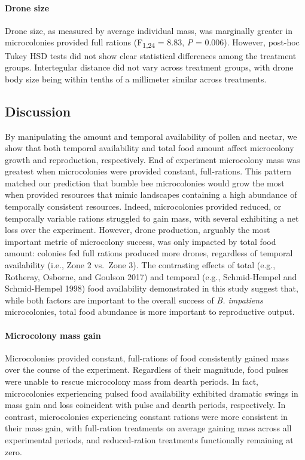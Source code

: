 \documentclass[11pt,]{article}
\let\oldparagraph\paragraph
\renewcommand{\paragraph}[1]{\oldparagraph{#1}\mbox{}}
\begin{document}
\hypertarget{drone-size}{%
\paragraph{Drone size}\label{drone-size}}

Drone size, as measured by average individual mass, was marginally
greater in microcolonies provided full rations (F\textsubscript{1,24} =
8.83, \emph{P} = 0.006). However, post-hoc Tukey HSD tests did not show
clear statistical differences among the treatment groups. Intertegular
distance did not vary across treatment groups, with drone body size
being within tenths of a millimeter similar across treatments.

\hypertarget{discussion}{%
\subsection{Discussion}\label{discussion}}

By manipulating the amount and temporal availability of pollen and
nectar, we show that both temporal availability and total food amount
affect microcolony growth and reproduction, respectively. End of
experiment microcolony mass was greatest when microcolonies were
provided constant, full-rations. This pattern matched our prediction
that bumble bee microcolonies would grow the most when provided
resources that mimic landscapes containing a high abundance of
temporally consistent resources. Indeed, microcolonies provided reduced,
or temporally variable rations struggled to gain mass, with several
exhibiting a net loss over the experiment. However, drone production,
arguably the most important metric of microcolony success, was only
impacted by total food amount: colonies fed full rations produced more
drones, regardless of temporal availability (i.e., Zone 2 vs.~Zone 3).
The contrasting effects of total (e.g., Rotheray, Osborne, and Goulson
2017) and temporal (e.g., Schmid-Hempel and Schmid-Hempel 1998) food
availability demonstrated in this study suggest that, while both factors
are important to the overall success of \emph{B. impatiens}
microcolonies, total food abundance is more important to reproductive
output.

\hypertarget{microcolony-mass-gain}{%
\paragraph{Microcolony mass gain}\label{microcolony-mass-gain}}

Microcolonies provided constant, full-rations of food consistently
gained mass over the course of the experiment. Regardless of their
magnitude, food pulses were unable to rescue microcolony mass from
dearth periods. In fact, microcolonies experiencing pulsed food
availability exhibited dramatic swings in mass gain and loss coincident
with pulse and dearth periods, respectively. In contrast, microcolonies
experiencing constant rations were more consistent in their mass gain,
with full-ration treatments on average gaining mass across all
experimental periods, and reduced-ration treatments functionally
remaining at zero.
\end{document}

